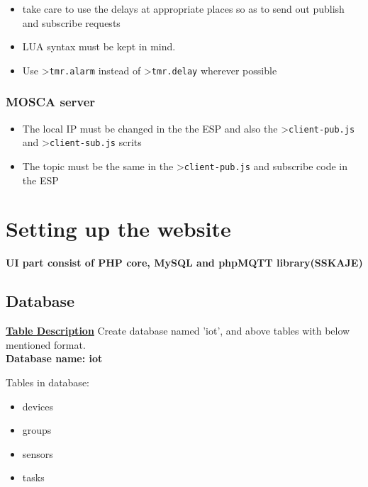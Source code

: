 \documentclass[16pt]{article}
\begin{document}
\begin{itemize}

\item
  take care to use the delays at appropriate places so as to send out
  publish and subscribe requests
\item
  LUA syntax must be kept in mind.
\item
  Use \textgreater{}\texttt{tmr.alarm} instead of
  \textgreater{}\texttt{tmr.delay} wherever possible
\end{itemize}

\vspace{0.6cm}

\subsubsection{MOSCA server}

\begin{itemize}

\item
  The local IP must be changed in the the ESP and also the
  \textgreater{}\texttt{client-pub.js} and
  \textgreater{}\texttt{client-sub.js} scrits
\item
  The topic must be the same in the \textgreater{}\texttt{client-pub.js}
  and subscribe code in the ESP
\end{itemize}

\vspace{0.5cm}



\vspace{12cm}

\section{Setting up the website}
{{\textbf{UI part consist of PHP core, MySQL and phpMQTT library(SSKAJE) }}}
\subsection{Database}
\vspace{0.3cm}
{\Large{\underline{\textbf{Table Description}}}}
\vspace{0.2cm}
Create database named 'iot', and above tables with below mentioned format.\\
\textbf{Database name: iot}

Tables in database: 

\begin{itemize}

\item devices
\item groups 
\item sensors
\item tasks  

\end{itemize}
\end{document}
